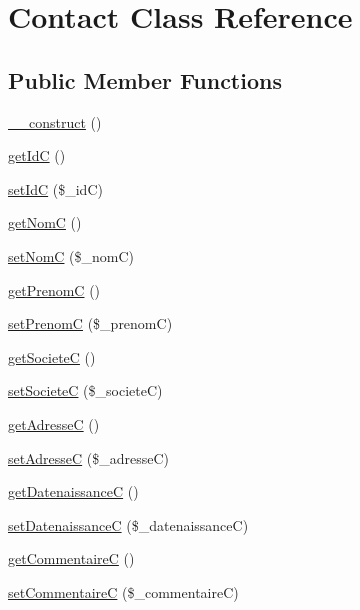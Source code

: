 \hypertarget{class_contact}{}\section{Contact Class Reference}
\label{class_contact}
\subsection*{Public Member Functions}
\begin{DoxyCompactItemize}
\item 
\hyperlink{class_contact_a095c5d389db211932136b53f25f39685}{\+\_\+\+\_\+construct} ()
\item 
\hyperlink{class_contact_ae447e2401431242a5d60c9ffc3262238}{get\+IdC} ()
\item 
\hyperlink{class_contact_a84af00fb01af735e355fef9528dfdffe}{set\+IdC} (\$\+\_\+idC)
\item 
\hyperlink{class_contact_a747e2793a12dc94501708c74a9b2acb2}{get\+NomC} ()
\item 
\hyperlink{class_contact_a2025d3ea03261afa4420d49ff41c7a8a}{set\+NomC} (\$\+\_\+nomC)
\item 
\hyperlink{class_contact_ab2eb595967aadaecc1c46a6d900f52e5}{get\+PrenomC} ()
\item 
\hyperlink{class_contact_a779d5fa33b1b1d9aa8ac036549612b74}{set\+PrenomC} (\$\+\_\+prenomC)
\item 
\hyperlink{class_contact_a77bd836d4246ea19b2df1f7ac1923a5c}{get\+SocieteC} ()
\item 
\hyperlink{class_contact_a9c23ebf60d84a4106d46bc9175d5d11b}{set\+SocieteC} (\$\+\_\+societeC)
\item 
\hyperlink{class_contact_a5a0f5742d37dc1cfa95c14eb399c859a}{get\+AdresseC} ()
\item 
\hyperlink{class_contact_a78ff82d992475151b042fc0c59d7852b}{set\+AdresseC} (\$\+\_\+adresseC)
\item 
\hyperlink{class_contact_ac52b57078c77b0418899a0adeddc8973}{get\+DatenaissanceC} ()
\item 
\hyperlink{class_contact_aca45aee44545d278835230e74736f639}{set\+DatenaissanceC} (\$\+\_\+datenaissanceC)
\item 
\hyperlink{class_contact_addef79c36bfeb21b1c04a5723c43d1e2}{get\+CommentaireC} ()
\item 
\hyperlink{class_contact_a78aa13315368f029cf258171d05949da}{set\+CommentaireC} (\$\+\_\+commentaireC)
\end{DoxyCompactItemize}


